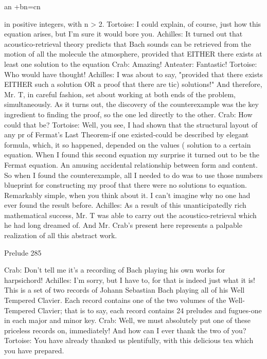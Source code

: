                                         an +bn=cn

   in positive integers, with n > 2.
Tortoise: I could explain, of course, just how this equation arises, but I’m sure it would
   bore you.
Achilles: It turned out that acoustico-retrieval theory predicts that Bach sounds can be
   retrieved from the motion of all the molecule the atmosphere, provided that EITHER
   there exists at least one solution to the equation
Crab: Amazing!
Anteater: Fantastic!
Tortoise: Who would have thought!
Achilles: I was about to say, "provided that there exists EITHER such a solution OR a
   proof that there are tic) solutions!" And therefore, Mr. T, in careful fashion, set about
   working at both ends of the problem, simultaneously. As it turns out, the discovery of
   the counterexample was the key ingredient to finding the proof, so the one led directly
   to the other.
Crab: How could that be?
Tortoise: Well, you see, I had shown that the structural layout of any pr of Fermat's Last
   Theorem-if one existed-could be described by elegant formula, which, it so happened,
   depended on the values ( solution to a certain equation. When I found this second
   equation my surprise it turned out to be the Fermat equation. An amusing accidental
   relationship between form and content. So when I found the counterexample, all I
   needed to do was to use those numbers blueprint for constructing my proof that there
   were no solutions to equation. Remarkably simple, when you think about it. I can't
   imagine why no one had ever found the result before.
Achilles: As a result of this unanticipatedly rich mathematical success, Mr. T was able to
   carry out the acoustico-retrieval which he had long dreamed of. And Mr. Crab's
   present here represents a palpable realization of all this abstract work.




Prelude                                                                                 285

Crab: Don't tell me it's a recording of Bach playing his own works for harpsichord!
Achilles: I'm sorry, but I have to, for that is indeed just what it is! This is a set of two
   records of Johann Sebastian Bach playing all of his Well Tempered Clavier. Each
   record contains one of the two volumes of the Well-Tempered Clavier; that is to say,
   each record contains 24 preludes and fugues-one in each major and minor key.
Crab: Well, we must absolutely put one of these priceless records on, immediately! And
   how can I ever thank the two of you?
Tortoise: You have already thanked us plentifully, with this delicious tea which you have
   prepared.

